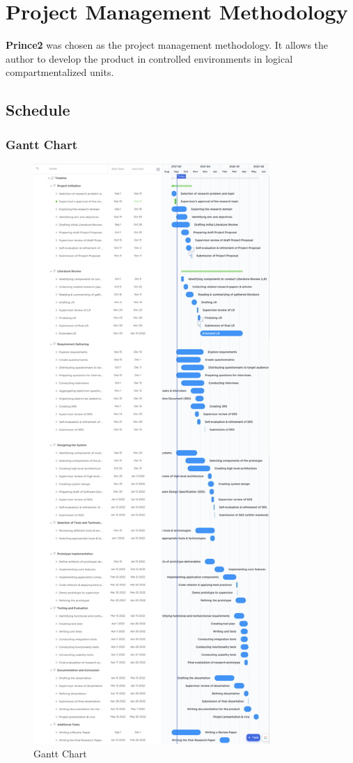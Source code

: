 \documentclass[a4paper, 12pt, oneside]{report}
\begin{document}
\section{Project Management Methodology}
\textbf{Prince2}  was chosen as the project management methodology. It allows the author to develop the product in controlled environments in logical compartmentalized units.
 
\newpage
\subsection{Schedule}
\subsubsection{Gantt Chart}
\begin{figure}[h!]
\centering
\includegraphics[width=0.8\textwidth,height=0.85\textheight]{images/gantt-chart.png}
\caption{Gantt Chart}
\end{figure}
\end{document}
